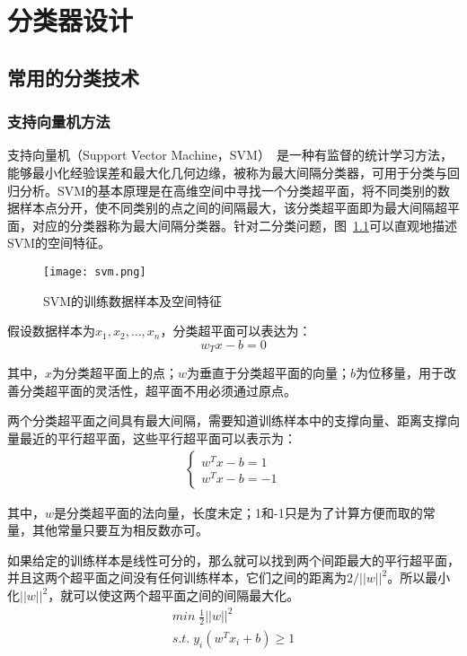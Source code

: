 \chapter{分类器设计}

\section{常用的分类技术}
\label{4.1}

\subsection{支持向量机方法}

支持向量机（Support Vector Machine，SVM）~\cite{cortes1995support}是一种有监督的统计学习方法，能够最小化经验误差和最大化几何边缘，被称为最大间隔分类器，可用于分类与回归分析。SVM的基本原理是在高维空间中寻找一个分类超平面，将不同类别的数据样本点分开，使不同类别的点之间的间隔最大，该分类超平面即为最大间隔超平面，对应的分类器称为最大间隔分类器。针对二分类问题，图~\ref{fig: svm}可以直观地描述SVM的空间特征。

\begin{figure}[!ht]
 \centering
 \texttt{[image: svm.png]}
\caption{SVM的训练数据样本及空间特征}
\label{fig: svm}
\end{figure}

假设数据样本为$x_1, x_2, \ldots, x_n$，分类超平面可以表达为：
\begin{equation}
w_Tx - b = 0 
\end{equation}

其中，$x$为分类超平面上的点；$w$为垂直于分类超平面的向量；$b$为位移量，用于改善分类超平面的灵活性，超平面不用必须通过原点。

两个分类超平面之间具有最大间隔，需要知道训练样本中的支撑向量、距离支撑向量最近的平行超平面，这些平行超平面可以表示为：
\begin{align}
\left\{ \begin{array}{l}
w^T x - b = 1\\
w^T x - b = -1
\end{array} \right.
\end{align}

其中，$w$是分类超平面的法向量，长度未定；1和-1只是为了计算方便而取的常量，其他常量只要互为相反数亦可。

如果给定的训练样本是线性可分的，那么就可以找到两个间距最大的平行超平面，并且这两个超平面之间没有任何训练样本，它们之间的距离为$2/||w||^2$。所以最小化$||w||^2$，就可以使这两个超平面之间的间隔最大化。
\begin{align}
min \; \frac{1}{2}||w||^2\\
s.t.\; y_i(w^Tx_i + b) \ge 1
\end{align}

